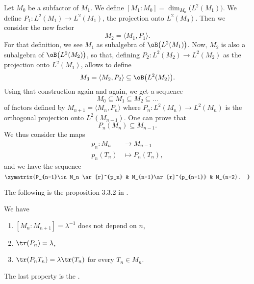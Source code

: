 Let $M_0$ be a subfactor of $M_1$. We define $[M_1:M_0]=\dim_{M_0}\big( L^2(M_1) \big)$. We define $P_1\colon  L^2(M_1)\to L^2(M_1)$, the projection onto $L^2(M_0)$. Then we consider the new factor
\begin{equation}
	M_2=\langle M_1, P_1\rangle.
\end{equation}
For that definition, we see $M_1$ as subalgebra of $\oB\big( L^2(M_1) \big)$. Now, $M_2$ is also a subalgebra of $\oB\big( L^2(M_2) \big)$, so that, defining $P_2\colon L^2(M_2)\to L^2(M_2)$ as the projection onto $L^2(M_1)$, allows to define
\begin{equation}
	M_3=\langle M_2, P_2\rangle \subseteq\oB\big( L^2(M_2) \big).
\end{equation}
Using that construction again and again, we get a sequence
\begin{equation}
	M_0\subseteq M_1\subseteq M_2\subseteq\ldots
\end{equation}
of factors defined by $M_{n+1}=\langle M_n, P_n\rangle $ where $P_n\colon L^2(M_n)\to L^2(M_n)$ is the orthogonal projection onto $L^2(M_{n-1})$. One can prove that
\begin{equation}
	P_n(M_n)\subseteq M_{n-1}.
\end{equation}
We thus consider the maps
\begin{equation}
\begin{aligned}
 p_n\colon M_n&\to M_{n-1} \\
   p_n(T_n)&\mapsto P_n(T_n),
\end{aligned}
\end{equation}
and we have the sequence
\begin{equation}
\xymatrix{%
   P_{n-1}\in M_n \ar[r]^{p_n}	&	M_{n-1}\ar[r]^{p_{n-1}}	& M_{n-2}.
}
\end{equation}

The following is the proposition 3.3.2 in \cite{JonesSunder}.

\begin{proposition}		\label{ProppropsindexMarkov}
We have
\begin{enumerate}
\item $[M_n:M_{n+1}]=\lambda^{-1}$ does not depend on $n$,
\item $\tr(P_n)=\lambda$,
\item $\tr(P_nT_n)=\lambda\tr(T_n)$ for every $T_n\in M_n$.
\end{enumerate}
\end{proposition}

The last property is the .

